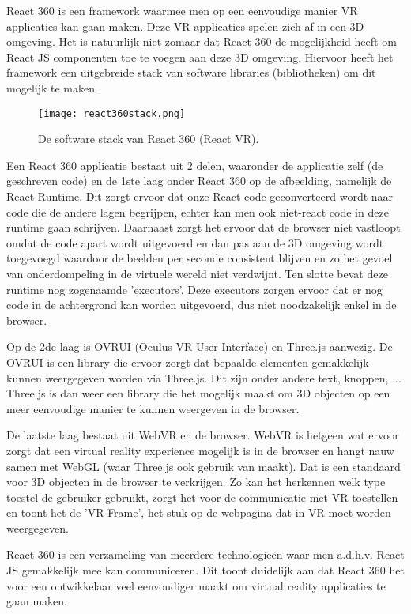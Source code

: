 React 360 is een framework waarmee men op een eenvoudige manier VR applicaties kan gaan maken. Deze VR applicaties spelen zich af in een 3D omgeving. Het is natuurlijk niet zomaar dat React 360 de mogelijkheid heeft om React JS componenten toe te voegen aan deze 3D omgeving. Hiervoor heeft het framework een uitgebreide stack van software libraries (bibliotheken) om dit mogelijk te maken \autocite{Bieronski2016}.

\begin{figure}[H]
	\centering
	\texttt{[image: react360stack.png]}
	\caption{De software stack van React 360 (React VR).}
	\label{fig:react360-stack}
\end{figure}

Een React 360 applicatie bestaat uit 2 delen, waaronder de applicatie zelf (de geschreven code) en de 1ste laag onder React 360 op de afbeelding,  namelijk de React Runtime. Dit zorgt ervoor dat onze React code geconverteerd wordt naar code die de andere lagen begrijpen, echter kan men ook niet-react code in deze runtime gaan schrijven. Daarnaast zorgt het ervoor dat de browser niet vastloopt omdat de code apart wordt uitgevoerd en dan pas aan de 3D omgeving wordt toegevoegd waardoor de beelden per seconde consistent blijven en zo het gevoel van onderdompeling in de virtuele wereld niet verdwijnt. Ten slotte bevat deze runtime nog zogenaamde 'executors'. Deze executors zorgen ervoor dat er nog code in de achtergrond kan worden uitgevoerd, dus niet noodzakelijk enkel in de browser.

Op de 2de laag is OVRUI (Oculus VR User Interface) en Three.js aanwezig. De OVRUI is een library die ervoor zorgt dat bepaalde elementen gemakkelijk kunnen weergegeven worden via Three.js. Dit zijn onder andere text, knoppen, ... Three.js is dan weer een library die het mogelijk maakt om 3D objecten op een meer eenvoudige manier te kunnen weergeven in de browser.

De laatste laag bestaat uit WebVR en de browser. WebVR is hetgeen wat ervoor zorgt dat een virtual reality experience mogelijk is in de browser en hangt nauw samen met WebGL (waar Three.js ook gebruik van maakt). Dat is een standaard voor 3D objecten in de browser te verkrijgen. Zo kan het herkennen welk type toestel de gebruiker gebruikt, zorgt het voor de communicatie met VR toestellen en toont het de 'VR Frame', het stuk op de webpagina dat in VR moet worden weergegeven. 

React 360 is een verzameling van meerdere technologieën waar men a.d.h.v. React JS gemakkelijk mee kan communiceren. Dit toont duidelijk aan dat React 360 het voor een ontwikkelaar veel eenvoudiger maakt om virtual reality applicaties te gaan maken.

